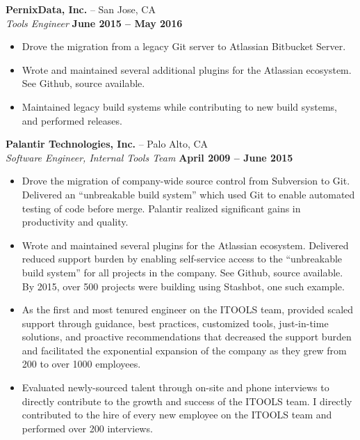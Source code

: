 \documentclass[line, margin]{res}
\begin{document}
\begin{resume}
{\bf PernixData, Inc.} -- San Jose, CA
\\
\textit{Tools Engineer} \hfill {\bf June 2015 -- May 2016}
\\
\begin{itemize}
\item
Drove the migration from a legacy Git server to Atlassian Bitbucket Server.
\item
Wrote and maintained several additional plugins for the Atlassian ecosystem.
See Github, source available.
\item
Maintained legacy build systems while contributing to new build systems, and performed releases.
\end{itemize}

{\bf Palantir Technologies, Inc.} -- Palo Alto, CA
\\
\textit{Software Engineer, Internal Tools Team} \hfill {\bf April 2009 -- June 2015}
\\
\begin{itemize}
\item
Drove the migration of company-wide source control from Subversion to Git.
Delivered an ``unbreakable build system'' which used Git to enable automated
testing of code before merge.  Palantir realized significant gains in
productivity and quality.
\item
Wrote and maintained several plugins for the Atlassian ecosystem.  Delivered
reduced support burden by enabling self-service access to the ``unbreakable
build system'' for all projects in the company.  See Github, source available.
By 2015, over 500 projects were building using Stashbot, one such example.
\item
As the first and most tenured engineer on the ITOOLS team, provided scaled
support through guidance, best practices, customized tools, just-in-time
solutions, and proactive recommendations that decreased the support burden and
facilitated the exponential expansion of the company as they grew from 200 to
over 1000 employees.
\item
Evaluated newly-sourced talent through on-site and phone interviews to directly
contribute to the growth and success of the ITOOLS team.  I directly
contributed to the hire of every new employee on the ITOOLS team and performed
over 200 interviews.
\end{itemize}


\end{resume}
\end{document}
